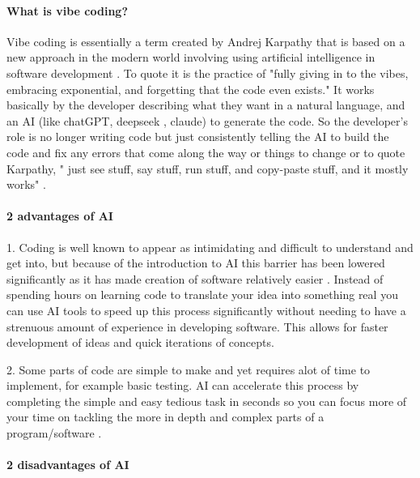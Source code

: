 \documentclass{article}
\begin{document}
\paragraph{What is vibe coding?}

Vibe coding is essentially a term created by Andrej Karpathy that is based on a new approach in the modern world involving using artificial intelligence in software development \cite{vibe-coding-techradar}. To quote it is the practice of "fully giving in to the vibes, embracing exponential, and forgetting that the code even exists." It works basically by the developer describing what they want in a natural language, and an AI (like chatGPT, deepseek , claude) to generate the code. So the developer's role is no longer writing code but just consistently telling the AI to build the code and fix any errors that come along the way or things to change or to quote Karpathy, " just see stuff, say stuff, run stuff, and copy-paste stuff, and it mostly works" \cite{vibe-coding-techradar}.

\paragraph{2 advantages of AI}

1. Coding is well known to appear as intimidating and difficult to understand and get into, but because of the introduction to AI this barrier has been lowered significantly as it has made creation of software relatively easier \cite{vibe-coding-techradar}. Instead of spending hours on learning code to translate your idea into something real you can use AI tools to speed up this process significantly without needing to have a strenuous amount of experience in developing software. This allows for faster development of ideas and quick iterations of concepts.

2. Some parts of code are simple to make and yet requires alot of time to implement, for example basic testing. AI can accelerate this process by completing the simple and easy tedious task in seconds so you can focus more of your time on tackling the more in depth and complex parts of a program/software \cite{vibe-coding-techradar}.

\paragraph{2 disadvantages of AI}
\end{document}
